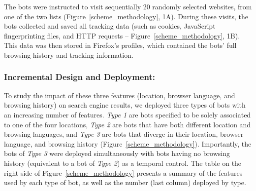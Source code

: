 The bots were instructed to visit sequentially 20 randomly selected websites, from one of the two lists (Figure~\ref{scheme_methodology}, 1A). During these visits, the bots collected and saved all tracking data (such as cookies, JavaScript fingerprinting files, and HTTP requests -- Figure~\ref{scheme_methodology}, 1B). This data was then stored in Firefox's profiles, which contained the bots' full browsing history and tracking information. 

\subsubsection{Incremental Design and Deployment:} 
To study the impact of these three features (location, browser language, and browsing history) on search engine results, we deployed three types of bots with an increasing number of features. \textit{Type 1} are bots specified to be solely associated to one of the four locations, \textit{Type 2} are bots that have both different location and browsing languages, and \textit{Type 3} are bots that diverge in their location, browser language, and browsing history (Figure~\ref{scheme_methodology}). Importantly, the bots of \textit{Type 3} were deployed simultaneously with bots having no browsing history (equivalent to a bot of \textit{Type 2}) as a temporal control. The table on the right side of Figure~\ref{scheme_methodology} presents a summary of the features used by each type of bot, as well as the number (last column) deployed by type. 




